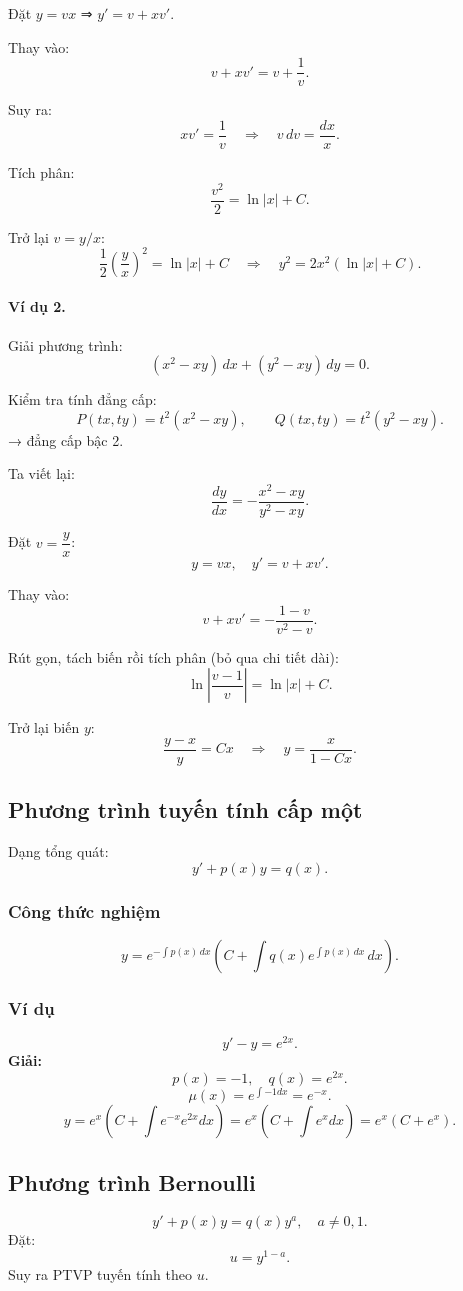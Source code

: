 \documentclass[12pt,a4paper]{article}
\begin{document}
Đặt $y = vx$ ⇒ $y' = v + x v'$.

Thay vào:
\[
v + xv' = v + \frac{1}{v}.
\]

Suy ra:
\[
x v' = \frac{1}{v}
\quad\Rightarrow\quad
v\, dv = \frac{dx}{x}.
\]

Tích phân:
\[
\frac{v^2}{2} = \ln|x| + C.
\]

Trở lại $v = y/x$:
\[
\frac{1}{2}\left(\frac{y}{x}\right)^2 = \ln|x| + C
\quad\Rightarrow\quad
y^2 = 2x^2 (\ln|x| + C).
\]

\paragraph{Ví dụ 2.}
Giải phương trình:
\[
(x^2 - xy)\,dx + (y^2 - xy)\,dy = 0.
\]

Kiểm tra tính đẳng cấp:
\[
P(tx,ty)=t^2(x^2-xy),\qquad
Q(tx,ty)=t^2(y^2-xy).
\]
→ đẳng cấp bậc 2.

Ta viết lại:
\[
\frac{dy}{dx} = -\frac{x^2 - xy}{y^2 - xy}.
\]

Đặt $v=\dfrac{y}{x}$:
\[
y=vx,\quad y' = v + xv'.
\]

Thay vào:
\[
v + xv' = -\frac{1 - v}{v^2 - v}.
\]

Rút gọn, tách biến rồi tích phân (bỏ qua chi tiết dài):
\[
\ln\left|\frac{v-1}{v}\right| = \ln|x| + C.
\]

Trở lại biến $y$:
\[
\frac{y-x}{y} = Cx
\quad\Rightarrow\quad
y = \frac{x}{1 - Cx}.
\]


\subsection{Phương trình tuyến tính cấp một}
Dạng tổng quát:
\[
y' + p(x)y = q(x).
\]

\subsubsection*{Công thức nghiệm}
\[
y = e^{-\int p(x)\,dx}\left( C + \int q(x)e^{\int p(x)\,dx}\,dx \right).
\]

\subsubsection*{Ví dụ}
\[
y' - y = e^{2x}.
\]
\textbf{Giải:}
\[
p(x) = -1,\quad q(x)=e^{2x}.
\]
\[
\mu(x)=e^{\int -1 dx}=e^{-x}.
\]
\[
y = e^{x}\left( C + \int e^{-x}e^{2x}dx\right)
= e^{x}\left( C + \int e^{x}dx \right)
= e^{x}(C + e^{x}).
\]

\subsection{Phương trình Bernoulli}
\[
y' + p(x)y = q(x)y^{a}, \quad a\neq 0,1.
\]
Đặt:
\[
u = y^{1-a}.
\]
Suy ra PTVP tuyến tính theo $u$.
\end{document}
